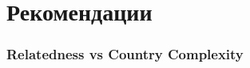 \section{Рекомендации}

\begin{frame}
    \frametitle{Relatedness vs Country Complexity}
    \begin{center}
        
    \end{center}
\end{frame}